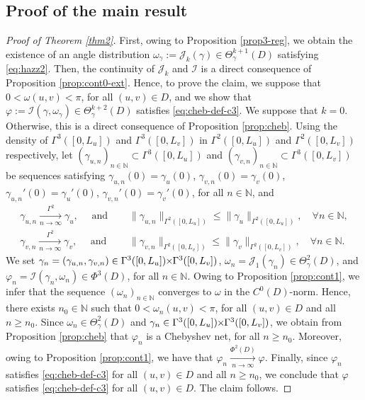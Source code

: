 \documentclass{article}
\newcommand{\I}{\mathcal{I}}
\newcommand{\PLH}{{\mkern-1mu\times\mkern-1mu}}
\newcommand{\Times}{\PLH}
\newcommand{\EN}{\mathbb{N}}
\newcommand{\J}{\mathcal{J}}
\theoremstyle{remark}
\theoremstyle{prpart}
\begin{document}
\subsection{Proof of the main result}

\begin{proof}[Proof of Theorem \ref{thm2}]
  First, owing to Proposition \ref{prop3-reg}, we obtain the existence of an angle distribution $\omega_\gamma:=\J_k(\gamma) \in  \Theta^{k+1}_\gamma(D)$ satisfying \eqref{eq:hazz2}. Then, the continuity of $\J_k$ and $\I$ is a direct consequence of Proposition \ref{prop:cont0-ext}. Hence, to prove the claim, we suppose that $0<\omega(u,v)<\pi$, for all $(u,v)\in D$, and we show that $\varphi:=\I(\gamma,\omega_\gamma) \in \Theta^{k+2}_\gamma(D)$ satisfies \eqref{eq:cheb-def-c3}. We suppose that $k=0$. Otherwise, this is a direct consequence of Proposition \ref{prop:cheb}. %
  Using the density of $\Gamma^3([0,L_u])$ and $\Gamma^3([0,L_v])$ in $\Gamma^2([0,L_u])$ and $\Gamma^2([0,L_v])$ respectively, let $(\gamma_{u,n})_{n\in\EN} \subset \Gamma^{3}([0,L_u])$ and $(\gamma_{v,n})_{n\in\EN} \subset \Gamma^{3}([0,L_v])$ be sequences satisfying $\gamma_{u,n}(0)=\gamma_u(0)$, $\gamma_{v,n}(0)=\gamma_v(0)$, $\gamma_{u,n}'(0)=\gamma_u'(0)$, $\gamma_{v,n}'(0)=\gamma_v'(0)$, for all $n\in\EN$, and 
  \begin{align*}
    \gamma_{u,n}\xrightarrow[n\to \infty]{\Gamma^{2}} \gamma_u,\quad\text{ and }&
                                                                                    \quad\|\gamma_{u,n}\|_{\Gamma^{2}([0,L_u])}\leq \|\gamma_u\|_{\Gamma^{2}([0,L_u])},\quad\forall n\in\EN,\\
    \gamma_{v,n}\xrightarrow[n\to \infty]{\Gamma^{2}}\gamma_v,\quad\text{ and }&
                                                                                   \quad\|\gamma_{v,n}\|_{\Gamma^{2}([0,L_v])}\leq \|\gamma_v\|_{\Gamma^{2}([0,L_v])},\quad\forall n\in\EN.
  \end{align*} 
  We set $\gamma_n = (\gamma_{u,n},\gamma_{v,n})\in \Gamma^{3}([0,L_u])\Times \Gamma^{3}([0,L_v])$, $\omega_n = \J_1(\gamma_n)\in \Theta^{2}_\gamma(D)$, and $\varphi_n = \I(\gamma_n,\omega_n)\in \Phi^{3}(D)$, for all $n\in\EN$. Owing to Proposition \ref{prop:cont1}, we infer that the sequence $(\omega_n)_{n\in\EN}$ converges to $\omega$ in the $C^{0}(D)$-norm. Hence, there exists $n_0\in\EN$ such that $0<\omega_n(u,v)<\pi$, for all $(u,v)\in D$ and all $n\geq n_0$. Since $\omega_n\in\Theta^{2}_\gamma(D)$ and $\gamma_n\in\Gamma^{3}([0,L_u])\Times\Gamma^{3}([0,L_v])$, we obtain from Proposition \ref{prop:cheb} that $\varphi_n$ is a Chebyshev net, for all $n\geq n_0$. Moreover, owing to Proposition \ref{prop:cont1}, we have that $\varphi_n\xrightarrow[n\to \infty]{\Phi^{2}(D)}\varphi$. Finally, since $\varphi_n$ satisfies \eqref{eq:cheb-def-c3} for all $(u,v)\in D$ and all $n\geq n_0$, we conclude that $\varphi$ satisfies \eqref{eq:cheb-def-c3} for all $(u,v)\in D$. The claim follows.
\end{proof}
\end{document}
